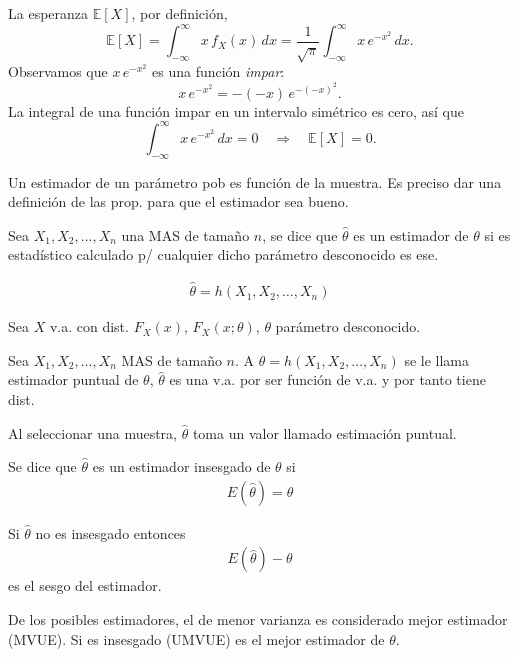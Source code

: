 \begin{Note}
La esperanza  \(\mathbb{E}[X]\),  por definición,
\[
\mathbb{E}[X]
= \int_{-\infty}^{\infty} x\,f_X(x)\,dx
= \frac{1}{\sqrt{\pi}}\int_{-\infty}^{\infty} x\,e^{-x^2}\,dx.
\]
Observamos que \(x\,e^{-x^2}\) es una función \emph{impar}:
\[
x\,e^{-x^2} = -(-x)\,e^{-(-x)^2}.
\]
La integral de una función impar en un intervalo simétrico es cero, así que
\[
\int_{-\infty}^{\infty} x\,e^{-x^2}\,dx = 0
\quad\Longrightarrow\quad
\mathbb{E}[X]=0.
\]

\end{Note}


\begin{Def}
Un estimador de un par\'ametro pob es funci\'on de la muestra. Es preciso dar una definici\'on de las prop. para que el estimador sea bueno.

Sea $X_1, X_2, \ldots, X_n$ una MAS de tama\~no $n$, se dice que
$\hat{\theta}$ es un estimador de $\theta$ si es estad\'istico calculado
p/ cualquier dicho par\'ametro desconocido es ese.

\begin{eqnarray*}
\hat{\theta} = h(X_1, X_2, \ldots, X_n)
\end{eqnarray*}
\end{Def}

\begin{Def}
Sea $X$ v.a. con dist. $F_X(x)$, $F_X(x;\theta)$, $\theta$ par\'ametro desconocido.

Sea $X_1, X_2, \ldots, X_n$ MAS de tama\~no $n$. A $\hat{\theta} = h(X_1, X_2, \ldots, X_n)$ se le llama estimador puntual de $\theta$, $\hat{\theta}$ es una v.a. por ser funci\'on de v.a. y por tanto tiene dist.

Al seleccionar una muestra, $\hat{\theta}$ toma un valor
llamado estimaci\'on puntual.
\end{Def}

\begin{Note}
Se dice que $\hat{\theta}$ es un estimador insesgado de $\theta$ si
\begin{eqnarray*}
E(\hat{\theta})=\theta
\end{eqnarray*}

Si $\hat{\theta}$ no es insesgado entonces
\begin{eqnarray*}
E(\hat{\theta})-\theta
\end{eqnarray*}
es el sesgo del estimador.
\end{Note}

\begin{Note}
De los posibles estimadores, el de menor varianza es considerado mejor estimador (MVUE). Si es insesgado (UMVUE) es el mejor estimador de $\theta$.
\end{Note}

